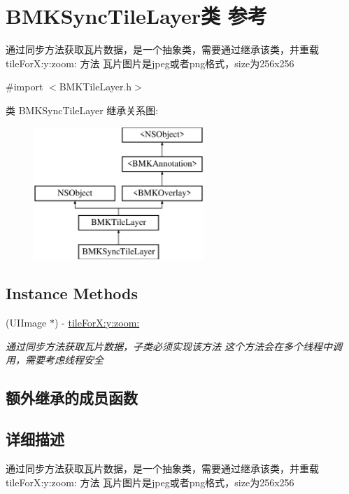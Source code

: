 \hypertarget{interface_b_m_k_sync_tile_layer}{}\section{B\+M\+K\+Sync\+Tile\+Layer类 参考}
\label{interface_b_m_k_sync_tile_layer}


通过同步方法获取瓦片数据，是一个抽象类，需要通过继承该类，并重载 tile\+For\+X\+:y\+:zoom\+: 方法 瓦片图片是jpeg或者png格式，size为256x256  




{\ttfamily \#import $<$B\+M\+K\+Tile\+Layer.\+h$>$}

类 B\+M\+K\+Sync\+Tile\+Layer 继承关系图\+:\begin{figure}[H]
\begin{center}
\leavevmode
\includegraphics[height=5.000000cm]{interface_b_m_k_sync_tile_layer}
\end{center}
\end{figure}
\subsection*{Instance Methods}
\begin{DoxyCompactItemize}
\item 
(U\+I\+Image $\ast$) -\/ \hyperlink{interface_b_m_k_sync_tile_layer_a069104d16e12a3bd4ea7838f1ce538f5}{tile\+For\+X\+:y\+:zoom\+:}
\begin{DoxyCompactList}\small\item\em 通过同步方法获取瓦片数据，子类必须实现该方法 这个方法会在多个线程中调用，需要考虑线程安全 \end{DoxyCompactList}\end{DoxyCompactItemize}
\subsection*{额外继承的成员函数}


\subsection{详细描述}
通过同步方法获取瓦片数据，是一个抽象类，需要通过继承该类，并重载 tile\+For\+X\+:y\+:zoom\+: 方法 瓦片图片是jpeg或者png格式，size为256x256 

